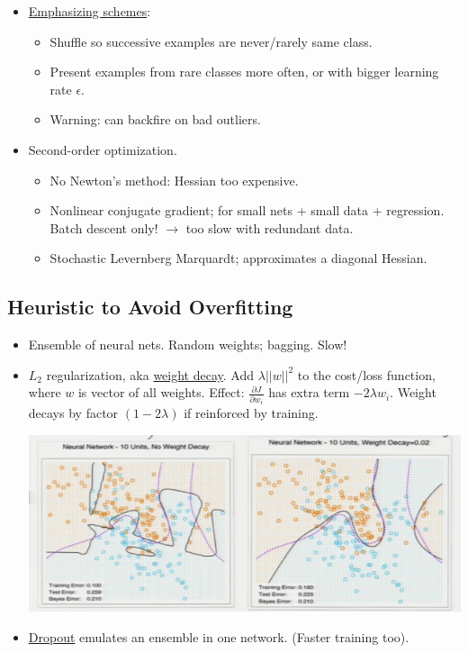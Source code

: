\documentclass[10pt]{article}
\begin{document}
\begin{itemize}
\begin{center}
		\end{center}
	\item \underline{Emphasizing schemes}:
		\begin{itemize}
			\item Shuffle so successive examples are never/rarely same class.
			\item Present examples from rare classes more often, or with bigger learning rate $\epsilon$.
			\item Warning: can backfire on bad outliers.
		\end{itemize}
	\item Second-order optimization.
		\begin{itemize}
			\item No Newton's method: Hessian too expensive.
			\item Nonlinear conjugate gradient; for small nets + small data + regression. Batch descent only! $\rightarrow$ too slow with redundant data.
			\item Stochastic Levernberg Marquardt; approximates a diagonal Hessian.
		\end{itemize}
\end{itemize}

\subsection*{Heuristic to Avoid Overfitting}
\begin{itemize}
	\item Ensemble of neural nets. Random weights; bagging. Slow!
	\item $L_{2}$ regularization, aka \underline{weight decay}. Add $\lambda ||w||^{2}$ to the cost/loss function, where $w$ is vector of all weights. Effect: $\frac{\partial J}{\partial w_{i}}$ has extra term $-2\lambda w_{i}$. Weight decays by factor $(1-2\lambda)$ if reinforced by training.
		\begin{center}
			\includegraphics[scale=0.6]{../images/weightdecay}
		\end{center}
	\item \underline{Dropout} emulates an ensemble in one network. (Faster training too).
\end{itemize}
\end{document}
